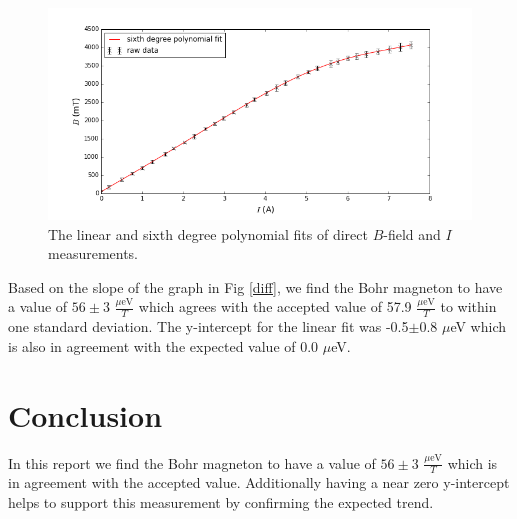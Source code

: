 \documentclass[prb,preprint]{revtex4-1}
\begin{document}
\newpage

\begin{figure}[h]
\centering
\includegraphics[width=\textwidth]{calib_IB.png}
\caption{The linear and sixth degree polynomial fits of direct $B$-field and $I$ measurements.}
\label{large}
\end{figure}

Based on the slope of the graph in Fig \ref{diff}, we find the Bohr magneton to have a value of $56\pm 3$ $\frac{\mu \text{eV}}{T}$ which agrees with the accepted value of 57.9 $\frac{\mu \text{eV}}{T}$ to within one standard deviation. The y-intercept for the linear fit was -0.5$\pm$0.8 $\mu$eV which is also in agreement with the expected value of 0.0 $\mu$eV.

\section{Conclusion}

In this report we find the Bohr magneton to have a value of $56\pm3$ $\frac{\mu \text{eV}}{T}$ which is in agreement with the accepted value. Additionally having a near zero y-intercept helps to support this measurement by confirming the expected trend.
\end{document}
